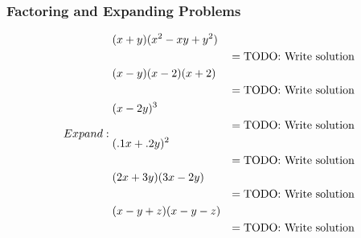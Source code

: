 \documentclass[leqno]{article}
\numberwithin{equation}{section}
\begin{document}
\subsubsection{Factoring and Expanding Problems}
\begin{subequations}
    Expand:
    \begin{align}%
        &(x+y)(x^2 - xy + y^2)&&\\
        &&=\text{TODO: Write solution}\notag\\
        &(x-y)(x-2)(x+2)&&\\
        &&=\text{TODO: Write solution}\notag\\
        &(x-2y)^3&&\\
        &&=\text{TODO: Write solution}\notag\\
        &(.1x+.2y)^2&&\\
        &&=\text{TODO: Write solution}\notag\\
        &(2x+3y)(3x-2y)&&\\
        &&=\text{TODO: Write solution}\notag\\
        &(x-y+z)(x-y-z)&&\\
        &&=\text{TODO: Write solution}\notag
    \end{align}
        
\end{subequations}

\newpage
\printbibliography
\end{document}
